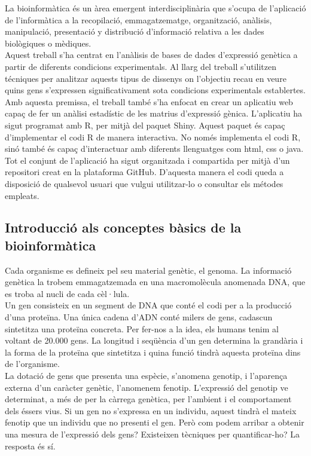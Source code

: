 \documentclass[english]{article}
\begin{document}
La bioinformàtica és un àrea emergent interdisciplinària que s'ocupa de l'aplicació de l'informàtica a la recopilació, emmagatzematge, organització, anàlisis, manipulació, presentació y distribució d'informació relativa a les dades biològiques o mèdiques.
\\

Aquest treball s'ha centrat en l'anàlisis de bases de dades d'expressió genètica a partir de diferents condicions experimentals. Al llarg del treball s'utilitzen técniques per analitzar aquests tipus de dissenys on l'objectiu recau en veure quins gens s'expressen significativament sota condicions experimentals establertes.
\\

Amb aquesta premissa, el treball també s'ha enfocat en crear un aplicatiu web capaç de fer un anàlisi estadístic de les matrius d'expressió gènica. L'aplicatiu ha sigut programat amb R, per mitjà del paquet Shiny. Aquest paquet és capa\c{c} d'implementar el codi R de manera interactiva. No només implementa el codi R, sinó també és capaç d'interactuar amb diferents llenguatges com html, css o java. Tot el conjunt de l'aplicació ha sigut organitzada i compartida per mitjà d'un repositori creat en la plataforma GitHub. D'aquesta manera el codi queda a disposició de qualsevol usuari que vulgui utilitzar-lo o consultar els métodes empleats.

\subsection{Introducció als conceptes bàsics de la bioinformàtica}

Cada organisme es defineix pel seu material genètic, el genoma. La informació genètica la trobem emmagatzemada en una macromolècula anomenada DNA, que es troba al nucli de cada cèl·lula.
\\

Un gen consisteix en un segment de DNA que conté el codi per a la producció d'una proteïna. Una única cadena d'ADN conté milers de gens, cadascun sintetitza una proteïna concreta. Per fer-nos a la idea, els humans tenim al voltant de 20.000 gens. La longitud i seqüència d'un gen determina la grandària i la forma de la proteïna que sintetitza i quina funció tindrà aquesta proteïna dins de l'organisme.
\\

La dotació de gens que presenta una espècie, s'anomena genotip, i l'aparen\c{c}a externa d'un caràcter genètic, l'anomenem fenotip. L'expressió del genotip ve determinat, a més de per la càrrega genètica, per l'ambient i el comportament dels éssers vius. Si un gen no s'expressa en un individu, aquest tindrà el mateix fenotip que un individu que no presenti el gen. Però com podem arribar a obtenir una mesura de l'expressió dels gens? Existeixen tècniques per quantificar-ho? La resposta és sí.
\\
\end{document}

